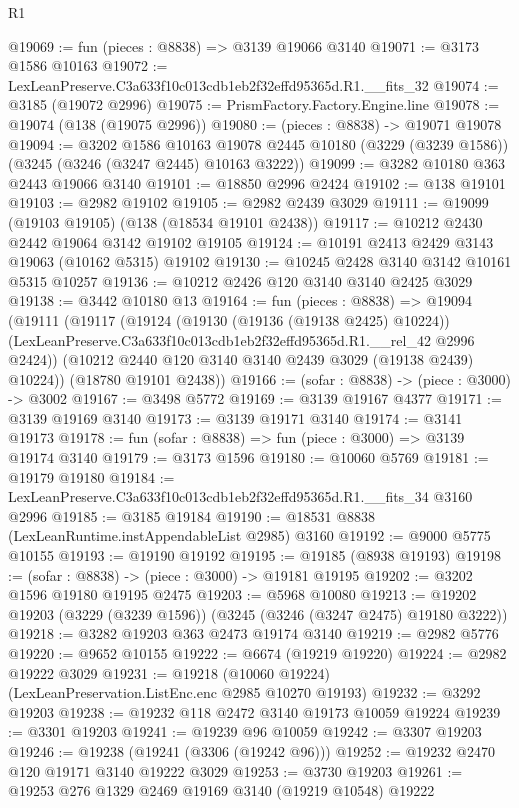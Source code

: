 \begin{lexlean}{R1}
\begin{coremodule}
@19069 := fun (pieces : @8838) => @3139 @19066 @3140
@19071 := @3173 @1586 @10163
@19072 := LexLeanPreserve.C3a633f10c013cdb1eb2f32effd95365d.R1.__fits_32
@19074 := @3185 (@19072 @2996)
@19075 := PrismFactory.Factory.Engine.line
@19078 := @19074 (@138 (@19075 @2996))
@19080 := (pieces : @8838) -> @19071 @19078
@19094 := @3202
    @1586
    @10163
    @19078
    @2445
    @10180
    (@3229 (@3239 @1586))
    (@3245 (@3246 (@3247 @2445) @10163 @3222))
@19099 := @3282 @10180 @363 @2443 @19066 @3140
@19101 := @18850 @2996 @2424
@19102 := @138 @19101
@19103 := @2982 @19102
@19105 := @2982 @2439 @3029
@19111 := @19099 (@19103 @19105) (@138 (@18534 @19101 @2438))
@19117 := @10212 @2430 @2442 @19064 @3142 @19102 @19105
@19124 := @10191 @2413 @2429 @3143 @19063 (@10162 @5315) @19102
@19130 := @10245 @2428 @3140 @3142 @10161 @5315 @10257
@19136 := @10212 @2426 @120 @3140 @3140 @2425 @3029
@19138 := @3442 @10180 @13
@19164 := fun (pieces : @8838) =>
  @19094
    (@19111
      (@19117
        (@19124
          (@19130 (@19136 (@19138 @2425) @10224))
          (LexLeanPreserve.C3a633f10c013cdb1eb2f32effd95365d.R1.__rel_42 @2996 @2424))
        (@10212 @2440 @120 @3140 @3140 @2439 @3029 (@19138 @2439) @10224))
      (@18780 @19101 @2438))
@19166 := (sofar : @8838) -> (piece : @3000) -> @3002
@19167 := @3498 @5772
@19169 := @3139 @19167 @4377
@19171 := @3139 @19169 @3140
@19173 := @3139 @19171 @3140
@19174 := @3141 @19173
@19178 := fun (sofar : @8838) => fun (piece : @3000) => @3139 @19174 @3140
@19179 := @3173 @1596
@19180 := @10060 @5769
@19181 := @19179 @19180
@19184 := LexLeanPreserve.C3a633f10c013cdb1eb2f32effd95365d.R1.__fits_34 @3160 @2996
@19185 := @3185 @19184
@19190 := @18531 @8838 (LexLeanRuntime.instAppendableList @2985) @3160
@19192 := @9000 @5775 @10155
@19193 := @19190 @19192
@19195 := @19185 (@8938 @19193)
@19198 := (sofar : @8838) -> (piece : @3000) -> @19181 @19195
@19202 := @3202 @1596 @19180 @19195 @2475
@19203 := @5968 @10080
@19213 := @19202 @19203 (@3229 (@3239 @1596)) (@3245 (@3246 (@3247 @2475) @19180 @3222))
@19218 := @3282 @19203 @363 @2473 @19174 @3140
@19219 := @2982 @5776
@19220 := @9652 @10155
@19222 := @6674 (@19219 @19220)
@19224 := @2982 @19222 @3029
@19231 := @19218 (@10060 @19224) (LexLeanPreservation.ListEnc.enc @2985 @10270 @19193)
@19232 := @3292 @19203
@19238 := @19232 @118 @2472 @3140 @19173 @10059 @19224
@19239 := @3301 @19203
@19241 := @19239 @96 @10059
@19242 := @3307 @19203
@19246 := @19238 (@19241 (@3306 (@19242 @96)))
@19252 := @19232 @2470 @120 @19171 @3140 @19222 @3029
@19253 := @3730 @19203
@19261 := @19253 @276 @1329 @2469 @19169 @3140 (@19219 @10548) @19222

\end{coremodule}
\end{lexlean}
